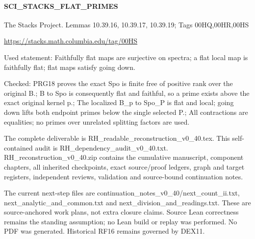 \paragraph{SCI\_\allowbreak{}STACKS\_\allowbreak{}FLAT\_\allowbreak{}PRIMES}The Stacks Project. Lemmas 10.39.16, 10.39.17, 10.39.19; Tags 00HQ,00HR,00HS

\url{https://stacks.math.columbia.edu/tag/00HS}

Used statement: Faithfully flat maps are surjective on spectra; a flat local map is faithfully flat; flat maps satisfy going down.

Checked: PRG18 proves the exact Spo is finite free of positive rank over the original B.; B to Spo is consequently flat and faithful, so a prime exists above the exact original kernel p.; The localized B\_\allowbreak{}p to Spo\_\allowbreak{}P is flat and local; going down lifts both endpoint primes below the single selected P.; All contractions are equalities; no primes over unrelated splitting factors are used.

The complete deliverable is RH\_\allowbreak{}readable\_\allowbreak{}reconstruction\_\allowbreak{}v0\_\allowbreak{}40.tex. This self-contained audit is RH\_\allowbreak{}dependency\_\allowbreak{}audit\_\allowbreak{}v0\_\allowbreak{}40.txt. RH\_\allowbreak{}reconstruction\_\allowbreak{}v0\_\allowbreak{}40.zip contains the cumulative manuscript, component chapters, all inherited checkpoints, exact source/\allowbreak{}proof ledgers, graph and target registers, independent reviews, validation and source-bound continuation notes.

The current next-step files are continuation\_\allowbreak{}notes\_\allowbreak{}v0\_\allowbreak{}40/\allowbreak{}next\_\allowbreak{}count\_\allowbreak{}ii.txt, next\_\allowbreak{}analytic\_\allowbreak{}and\_\allowbreak{}common.txt and next\_\allowbreak{}division\_\allowbreak{}and\_\allowbreak{}readings.txt. These are source-anchored work plans, not extra closure claims. Source Lean correctness remains the standing assumption; no Lean build or replay was performed. No PDF was generated. Historical RF16 remains governed by DEX11.
